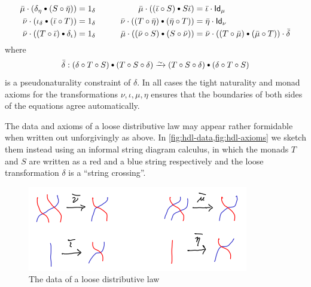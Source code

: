 \documentclass{amsart}
\let\tc\cdot
\newcommand{\bc}{\mathbin{\raisebox{1pt}{\scriptsize$\bullet$}}}
\let\oc\circ
\newcommand{\hunit}[1]{\Id_{#1}}
\newcommand{\Tmult}{\nu}
\newcommand{\Tunit}{\iota}
\newcommand{\Smult}{\mu}
\newcommand{\Sunit}{\eta}
\newcommand{\dl}{\delta}
\newcommand{\dlnat}{\bar\delta}
\newcommand{\Tdlmult}{\bar\Tmult}%
\newcommand{\Sdlmult}{\bar\Smult}%
\newcommand{\Tdlunit}{\bar\Tunit}%
\newcommand{\Sdlunit}{\bar\Sunit}%
\newcommand{\Id}{\mathsf{Id}}
\begin{document}
\begin{defn}
\begin{enumerate}
\begin{alignat*}{2}
        \Sdlmult \tc (\dl_{\Sunit} \bc (S\oc \Sdlunit)) &= 1_\dl &\qquad %
        \Sdlmult \tc ((\Tdlunit\oc S)\bc S\Tdlunit) &= \Tdlunit \tc \hunit{\Smult} \\ %
        \Tdlmult \tc (\Tunit_\dl \bc (\Tdlunit\oc T)) &= 1_\dl &\qquad    %
        \Tdlmult \tc ((T\oc\Sdlunit)\bc (\Sdlunit\oc T)) &= \Sdlunit \tc \hunit{\Tmult} \\ %
        \Tdlmult \tc ((T\oc\Tdlunit) \bc \dl_{\Tunit}) &= 1_\dl &\qquad  %
        \Sdlmult \tc ((\Tdlmult \oc S)\bc (S\oc \Tdlmult)) &= \Tdlmult \tc ((T\oc\Sdlmult)\bc (\Sdlmult\oc T)) \tc \dlnat %
      \end{alignat*}
      where
      \[\dlnat : (\dl\oc T\oc S) \bc (T\oc S\oc \dl) \toiso (T\oc S\oc \dl) \bc (\dl\oc T\oc S)\]
      is a pseudonaturality constraint of $\dl$.
      In all cases the tight naturality and monad axioms for the transformations $\Tmult,\Tunit,\Smult,\Sunit$ ensures that the boundaries of both sides of the equations agree automatically.
  \end{enumerate}
\end{defn}

The data and axioms of a loose distributive law may appear rather formidable when written out unforgivingly as above.
In \cref{fig:hdl-data,fig:hdl-axioms} we sketch them instead using an informal string diagram calculus, in which the monads $T$ and $S$ are written as a red and a blue string respectively and the loose transformation $\dl$ is a ``string crossing''.

\begin{figure}[p]
  \centering
  \includegraphics{hdl-data.png}
  \caption{The data of a loose distributive law}
  \label{fig:hdl-data}
\end{figure}
\end{document}

